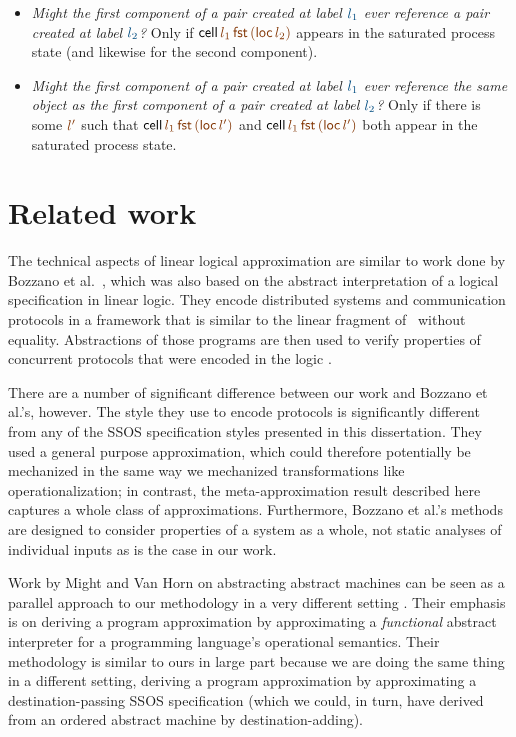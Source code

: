 \smallskip
\begin{itemize}
\item {\it Might the first component of a pair created at label
    $\obj{l_1}$ ever reference a pair created at label $\obj{l_2}$?}
  Only if ${\sf cell}\,\lf{l_1}\,\lf{\sf fst}\,\lf{({\sf loc}\,l_2)}$
  appears in the saturated process state (and likewise for the second
  component).
\item {\it Might the first component of a pair created at label
    $\obj{l_1}$ ever reference the same object as the first component
    of a pair created at label $\obj{l_2}$?} Only if there is some
  $\lf{l'}$ such that ${\sf cell}\,\lf{l_1}\,\lf{\sf fst}\,\lf{({\sf
      loc}\,l')}$ and ${\sf cell}\,\lf{l_1}\,\lf{\sf fst}\,\lf{({\sf
      loc}\,l')}$ both appear in the saturated process state.
\end{itemize}

\section{Related work}
\label{sec:approximately-related}

The technical aspects of linear logical approximation are similar to
work done by Bozzano et al.~\cite{bozzano02effective,bozzano04model},
which was also based on the abstract interpretation of a logical
specification in linear logic.
They encode distributed systems and communication protocols in
a framework that is similar to the linear fragment of \sls~without
equality. Abstractions of those programs are then used to verify
properties of concurrent protocols that were encoded in the logic
\cite{bozzano02protocol}. 

There are a number of significant difference between our work and
Bozzano et al.'s, however. The style they use to encode protocols is
significantly different from any of the SSOS specification styles
presented in this dissertation. They used a general purpose approximation,
which could therefore potentially be mechanized in the same way we
mechanized transformations like operationalization; in contrast, the
meta-approximation result described here captures a whole class of
approximations. Furthermore, Bozzano et al.'s methods are designed to
consider properties of a system as a whole, not static analyses of
individual inputs as is the case in our work.

Work by Might and Van Horn on abstracting abstract machines can be
seen as a parallel approach to our methodology in a very different
setting
\cite{might10resolving,might10abstract,might10abstracting}. Their
emphasis is on deriving a program approximation by approximating a
{\it functional} abstract interpreter for a programming language's
operational semantics. Their methodology is similar to ours in large
part because we are doing the same thing in a different setting,
deriving a program approximation by approximating a
destination-passing SSOS specification (which we could, in turn, have
derived from an ordered abstract machine by destination-adding).

